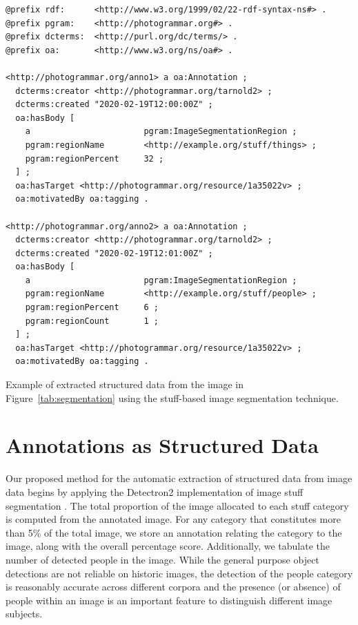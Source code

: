 \documentclass[10pt, a4paper]{article}
\begin{document}
\begin{lstfloat*}[!ht]
\begin{lstlisting}[frame=single]
@prefix rdf:      <http://www.w3.org/1999/02/22-rdf-syntax-ns#> .
@prefix pgram:    <http://photogrammar.org#> .
@prefix dcterms:  <http://purl.org/dc/terms/> .
@prefix oa:       <http://www.w3.org/ns/oa#> .

<http://photogrammar.org/anno1> a oa:Annotation ;
  dcterms:creator <http://photogrammar.org/tarnold2> ;
  dcterms:created "2020-02-19T12:00:00Z" ;
  oa:hasBody [
    a                       pgram:ImageSegmentationRegion ;
    pgram:regionName        <http://example.org/stuff/things> ;
    pgram:regionPercent     32 ;
  ] ;
  oa:hasTarget <http://photogrammar.org/resource/1a35022v> ;
  oa:motivatedBy oa:tagging .

<http://photogrammar.org/anno2> a oa:Annotation ;
  dcterms:creator <http://photogrammar.org/tarnold2> ;
  dcterms:created "2020-02-19T12:01:00Z" ;
  oa:hasBody [
    a                       pgram:ImageSegmentationRegion ;
    pgram:regionName        <http://example.org/stuff/people> ;
    pgram:regionPercent     6 ;
    pgram:regionCount       1 ;
  ] ;
  oa:hasTarget <http://photogrammar.org/resource/1a35022v> ;
  oa:motivatedBy oa:tagging .
\end{lstlisting}
\caption{Example of extracted structured data from the image in
Figure~\ref{tab:segmentation} using the stuff-based image segmentation
technique.}
\label{schema}
\end{lstfloat*}

\section{Annotations as Structured Data} \label{sec:method}

Our proposed method for the automatic extraction of structured data from image
data begins by applying the Detectron2 implementation of image stuff segmentation
\cite{wu2019detectron2}. The total proportion of the image allocated to each
stuff category is computed from the annotated image. For any category that
constitutes more than 5\% of the total image, we store an annotation relating the
category to the image, along with the overall percentage score. Additionally,
we tabulate the number of detected people in the image. While the general purpose
object detections are not reliable on historic images, the detection of the
people category is reasonably accurate across different corpora and the presence
(or absence) of people within an image is an important feature to distinguish
different image subjects.
\end{document}
